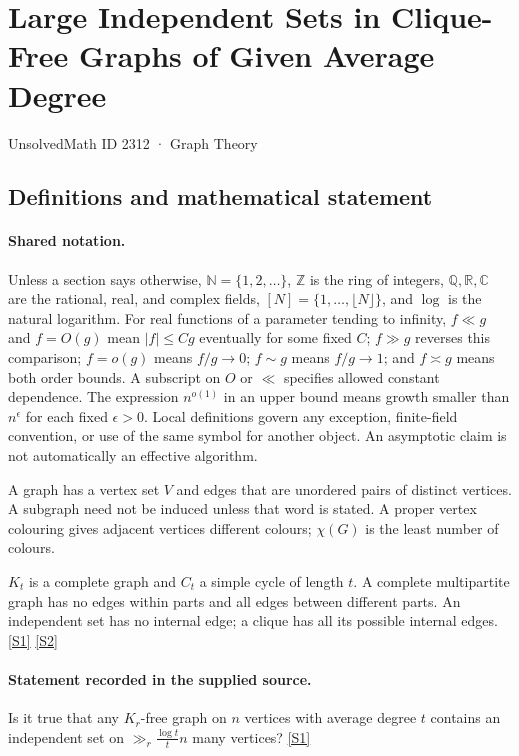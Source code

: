 \documentclass[11pt,a4paper]{article}
\newcommand{\N}{\mathbb{N}}
\newcommand{\Z}{\mathbb{Z}}
\newcommand{\Q}{\mathbb{Q}}
\newcommand{\R}{\mathbb{R}}
\newcommand{\C}{\mathbb{C}}
\newcommand{\sref}[2]{\hyperlink{source:#1:#2}{[S#2]}}
\begin{document}

\setcounter{section}{2311}

\section{Large Independent Sets in Clique-Free Graphs of Given Average Degree}\label{2312}

{\small\sffamily UnsolvedMath ID 2312 · Graph Theory}

\subsection{Definitions and mathematical statement}

\paragraph{Shared notation.}Unless a section says otherwise, $\N=\{1,2,\ldots\}$,
$\Z$ is the ring of integers, $\Q,\R,\C$ are the rational, real, and complex
fields, $[N]=\{1,\ldots,\lfloor N\rfloor\}$, and $\log$ is the natural
logarithm. For real functions of a parameter tending to infinity,
$f\ll g$ and $f=O(g)$ mean $|f|\leq Cg$ eventually for some fixed $C$;
$f\gg g$ reverses this comparison; $f=o(g)$ means $f/g\to0$;
$f\sim g$ means $f/g\to1$; and $f\asymp g$ means both order bounds.
A subscript on $O$ or $\ll$ specifies allowed constant dependence.
The expression $n^{o(1)}$ in an upper bound means growth smaller than
$n^\epsilon$ for each fixed $\epsilon>0$. Local definitions govern any
exception, finite-field convention, or use of the same symbol for another
object. An asymptotic claim is not automatically an effective algorithm.



A graph has a vertex set $V$ and edges that are unordered pairs of distinct vertices. A subgraph need not be induced unless that word is stated. A proper vertex colouring gives adjacent vertices different colours; $\chi(G)$ is the least number of colours.

$K_t$ is a complete graph and $C_t$ a simple cycle of length $t$. A complete multipartite graph has no edges within parts and all edges between different parts. An independent set has no internal edge; a clique has all its possible internal edges. \sref{2312}{1} \sref{2312}{2}

\paragraph{Statement recorded in the supplied source.}
Is it true that any $K_r$-free graph on $n$ vertices with average degree $t$ contains an independent set on $ \gg_r \frac{\log t}{t}n $ many vertices? \sref{2312}{1}
\end{document}
